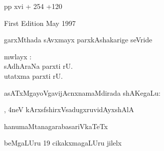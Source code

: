 \medskip
{\rm pp xvi + 254 +120}

\medskip
{\rm First Edition May 1997}

\bigskip
garxMthada sAvxmayx parxkAshakarige seVride

\bigskip
\begin{center}
{ mwlayx :}\\[15pt]
{sAdhAraNa parxti rU. }\\[15pt]
{utatxma parxti rU. }
\end{center}

\bigskip
\begin{center}
asATxMgayoVgavijAcnxnamaMdirada shAKegaLu:
\end{center}

, 4neV kArxsf\hfill shirxVsadugxruvidAyxshAlA

hanumaMtanagara\hfill basariVkaTeTx 

beMgaLUru 19 \hfill cikakxmagaLUru jilelx
